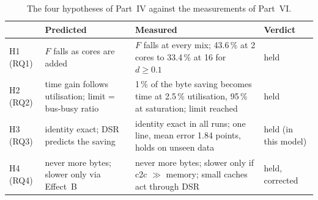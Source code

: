 \begin{table}[htbp]
\centering
\caption{The four hypotheses of Part~IV against the measurements of Part~VI.}
\label{tab:res-glance}
\small
\begin{tabular}{@{}L{1.3cm} L{3.7cm} L{5.3cm} L{2.2cm}@{}}
\toprule
 & Predicted & Measured & Verdict \\
\midrule
H1 (RQ1) & $F$ falls as cores are added & $F$ falls at every mix; 43.6\,\% at 2 cores
  to 33.4\,\% at 16 for $d \ge 0.1$ & held \\
H2 (RQ2) & time gain follows utilisation; limit = bus-busy ratio &
  1\,\% of the byte saving becomes time at 2.5\,\% utilisation, 95\,\% at
  saturation; limit reached & held \\
H3 (RQ3) & identity exact; DSR predicts the saving & identity exact in all runs;
  one line, mean error 1.84 points, holds on unseen data & held (in this model) \\
H4 (RQ4) & never more bytes; slower only via Effect~B & never more bytes; slower
  only if c2c $\gg$ memory; small caches act through DSR & held, corrected \\
\bottomrule
\end{tabular}
\end{table}
